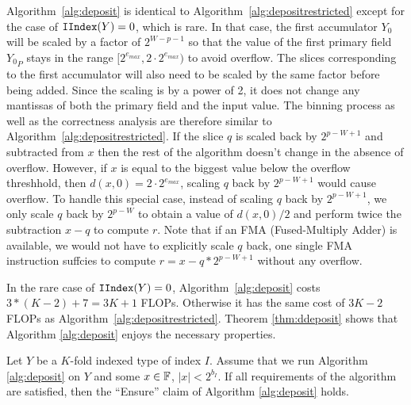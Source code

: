       Algorithm~\ref{alg:deposit} is identical to Algorithm~\ref{alg:depositrestricted} except
      for the case of $\mathtt{IIndex}(Y) = 0$, which is rare.
      In that case, the first accumulator $Y_0$ will be scaled by a factor of $2^{W-p-1}$
      so that the value of the first primary field ${Y_0}_P$ stays in the range
      $[2^{e_{max}}, 2 \cdot 2^{e_{max}})$ to avoid overflow.
      The slices corresponding to the first accumulator will also need to be scaled
      by the same factor before being added.
      Since the scaling is by a power of 2, it does not change any mantissas
      of both the primary field and the input value.
      The binning process as well as the correctness analysis
      are therefore similar to Algorithm~\ref{alg:depositrestricted}.
      If the slice $q$ is scaled back by $2^{p-W+1}$ and subtracted from $x$
      then the rest of the algorithm doesn't change in the absence of overflow.
      However, if $x$ is equal to the biggest value below the overflow threshhold,
      then $d(x,0) = 2\cdot 2^{e_{max}}$,
      scaling $q$ back by $2^{p-W+1}$ would cause overflow.
      To handle this special case, instead of scaling $q$ back by $2^{p-W+1}$,
      we only scale $q$ back by $2^{p-W}$ to obtain a value of $d(x,0)/2$
      and perform twice the subtraction $x-q$ to compute $r$.
      Note that if an FMA (Fused-Multiply Adder) is available,
      we would not have to explicitly scale $q$ back,
      one single FMA instruction suffcies to compute $r = x - q * 2^{p-W+1}$
      without any overflow.

      In the rare case of $\mathtt{IIndex}(Y) = 0$, Algorithm~\ref{alg:deposit}
      costs $3 * (K-2) + 7 = 3K+1$ FLOPs. Otherwise it has the same cost
      of $3K-2$ FLOPs as Algorithm~\ref{alg:depositrestricted}.
      Theorem \ref{thm:ddeposit} shows that Algorithm \ref{alg:deposit}
      enjoys the necessary properties.

      \begin{samepage}
      \begin{thm}
        Let $Y$ be a $K$-fold indexed type of index $I$. Assume that we run
        Algorithm \ref{alg:deposit} on $Y$ and some $x \in \mathbb{F}$, $|x|<2^{b_I}$.
        If all requirements of the algorithm are satisfied, then the
        ``Ensure'' claim of Algorithm \ref{alg:deposit} holds.
        \label{thm:ddeposit}
      \end{thm}
    \end{samepage}

